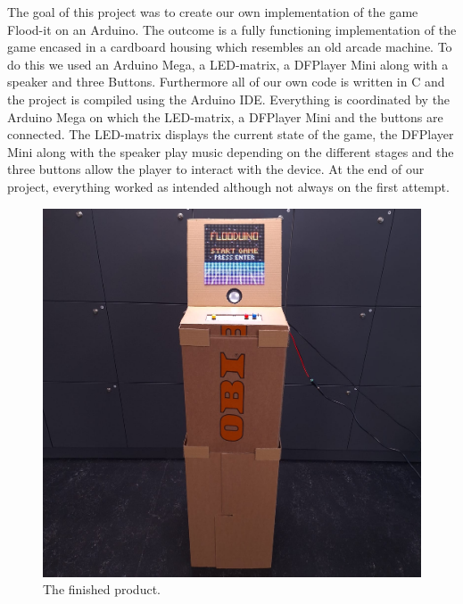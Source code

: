 \documentclass[10pt, a4paper]{article}
\begin{document}
The goal of this project was to create our own implementation of the game Flood-it on an Arduino.  The outcome is a fully functioning implementation of the game encased in a cardboard housing which resembles an old arcade machine. To do this we used an Arduino Mega, a LED-matrix, a DFPlayer Mini along with a speaker and three Buttons. Furthermore all of our own code is written in C and the project is compiled using the Arduino IDE. Everything is coordinated by the Arduino Mega on which the LED-matrix, a DFPlayer Mini and the buttons are connected. The LED-matrix displays the current state of the game, the DFPlayer Mini along with the speaker play music depending on the different stages and the three buttons allow the player to interact with the device. At the end of our project, everything worked as intended although not always on the first attempt.
\begin{figure}[h]
    \centering
    \begin{minipage}{0.48\linewidth}
    \centering
    \includegraphics[width=\linewidth]{Finished_Product.png}
    \caption{The finished product.}
    \end{minipage}
    \hfill
    \begin{minipage}{0.48\linewidth}

\end{minipage}
\end{figure}
\end{document}
